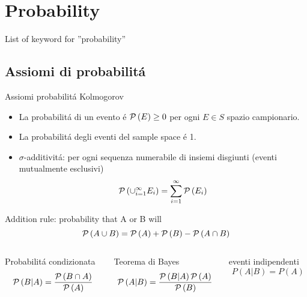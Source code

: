 \section{Probability}

\begin{frame}{List of keyword for ''probability''}
    \listofkeywords
\end{frame}
\subsection{Assiomi di probabilit\'a}

\begin{frame}{Assiomi probabilit\'a Kolmogorov}
\begin{itemize}
\item La probabilit\'a di un evento \'e $\operatorname{\mathcal{P}}{(E)}\geq0$ per ogni $E\in S$ spazio campionario.
\item La probabilit\'a degli eventi del sample space \'e 1.
\item $\sigma$-additivit\'a: per ogni sequenza numerabile di insiemi disgiunti (eventi mutualmente esclusivi)
\begin{equation*}
\operatorname{\mathcal{P}}{(\cup_{i=1}^{\infty}E_i)}=\sum_{i=1}^{\infty}\operatorname{\mathcal{P}}{(E_i)}
\end{equation*}
\end{itemize}
\begin{block}{Addition rule: probability that A or B will}
\begin{equation*}
\operatorname{\mathcal{P}}{(A\cup B)}=\operatorname{\mathcal{P}}{(A)}+\operatorname{\mathcal{P}}{(B)}-\operatorname{\mathcal{P}}{(A\cap B)}
\end{equation*}
\end{block}
\begin{columns}[T]
\begin{column}{0.3\textwidth}
\begin{block}{Probabilit\'a condizionata}
\[\operatorname{\mathcal{P}}{(B|A)}=\frac{\operatorname{\mathcal{P}}{(B\cap A)}}{\operatorname{\mathcal{P}}{(A)}}
\]
\end{block}
\end{column}
\begin{column}{0.4\textwidth}
\begin{block}{Teorema di Bayes}
\[\operatorname{\mathcal{P}}{(A|B)}=\frac{\operatorname{\mathcal{P}}{(B|A)}\operatorname{\mathcal{P}}{(A)}}{\operatorname{\mathcal{P}}{(B)}}\]
\end{block}
\end{column}
\begin{column}{0.25\textwidth}
\begin{block}{eventi indipendenti}
    \[P(A|B)=P(A)\]
    \end{block}
    \end{column}
\end{columns}
\end{frame}

